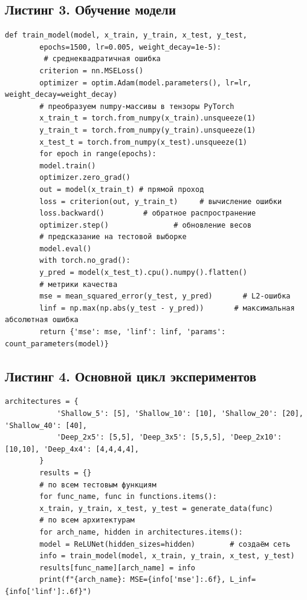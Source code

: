 \documentclass[12pt]{article}
\begin{document}
	\subsection*{Листинг 3. Обучение модели}
	\begin{lstlisting}[caption={Функция обучения и оценки}, label=lst:train]
		def train_model(model, x_train, y_train, x_test, y_test,
		epochs=1500, lr=0.005, weight_decay=1e-5):
		 # среднеквадратичная ошибка
		criterion = nn.MSELoss()                      
		optimizer = optim.Adam(model.parameters(), lr=lr, weight_decay=weight_decay)
		# преобразуем numpy-массивы в тензоры PyTorch
		x_train_t = torch.from_numpy(x_train).unsqueeze(1)
		y_train_t = torch.from_numpy(y_train).unsqueeze(1)
		x_test_t = torch.from_numpy(x_test).unsqueeze(1)
		for epoch in range(epochs):
		model.train()
		optimizer.zero_grad()
		out = model(x_train_t) # прямой проход                  
		loss = criterion(out, y_train_t)     # вычисление ошибки
		loss.backward()         # обратное распространение
		optimizer.step()               # обновление весов
		# предсказание на тестовой выборке
		model.eval()
		with torch.no_grad():
		y_pred = model(x_test_t).cpu().numpy().flatten()
		# метрики качества
		mse = mean_squared_error(y_test, y_pred)       # L2-ошибка
		linf = np.max(np.abs(y_test - y_pred))       # максимальная абсолютная ошибка
		return {'mse': mse, 'linf': linf, 'params': count_parameters(model)}
	\end{lstlisting}
	
	\subsection*{Листинг 4. Основной цикл экспериментов}
	\begin{lstlisting}[caption={Перебор архитектур на всех функциях}, label=lst:main]
		architectures = {
			'Shallow_5': [5], 'Shallow_10': [10], 'Shallow_20': [20], 'Shallow_40': [40],
			'Deep_2x5': [5,5], 'Deep_3x5': [5,5,5], 'Deep_2x10': [10,10], 'Deep_4x4': [4,4,4,4],
		}
		results = {}
		# по всем тестовым функциям
		for func_name, func in functions.items():      
		x_train, y_train, x_test, y_test = generate_data(func)
		# по всем архитектурам
		for arch_name, hidden in architectures.items(): 
		model = ReLUNet(hidden_sizes=hidden)        # создаём сеть
		info = train_model(model, x_train, y_train, x_test, y_test)
		results[func_name][arch_name] = info
		print(f"{arch_name}: MSE={info['mse']:.6f}, L_inf={info['linf']:.6f}")
	\end{lstlisting}
	
\end{document}
